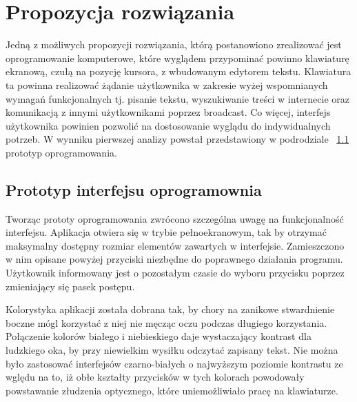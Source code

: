 \documentclass[twoside,a4paper]{book}
\begin{document}
\section{Propozycja rozwiązania}
Jedną z możliwych propozycji rozwiązania, którą postanowiono zrealizować jest oprogramowanie komputerowe, które wyglądem przypominać powinno klawiaturę ekranową, czułą na pozycję kursora, z wbudowanym edytorem tekstu. Klawiatura ta powinna realizować żądanie użytkownika w zakresie wyżej wspomnianych wymagań funkcjonalnych tj. pisanie tekstu, wyszukiwanie treści w internecie oraz komunikacją z innymi użytkownikami poprzez broadcast. Co więcej, interfejs użytkownika powinien pozwolić na dostosowanie wyglądu do indywidualnych potrzeb. W wynniku pierwszej analizy powstał przedstawiony w podrodziale ~\ref{sec:key} prototyp oprogramowania. 
\subsection{Prototyp interfejsu oprogramownia}\label{sec:key}
Tworząc prototy oprogramowania zwrócono szczególna uwagę na funkcjonalność interfejsu. Aplikacja otwiera się w trybie pełnoekranowym, tak by otrzymać maksymalny dostępny rozmiar elementów zawartych w interfejsie. Za\-mie\-szczo\-no w nim opisane powyżej przyciski niezbędne do poprawnego działania programu. Użytkownik informowany jest o pozostałym czasie do wyboru przycisku poprzez zmieniający się pasek postępu. 

Kolorystyka aplikacji została dobrana tak, by chory na zanikowe stwardnienie boczne  mógl korzystać z niej nie męcząc oczu podczas długiego korzystania. Połączenie kolorów bia\-łe\-go i niebieskiego daje wystaczający kontrast dla ludzkiego oka, by przy niewielkim wysiłku odczytać zapisany tekst. Nie można było zastosować interfejsów czarno-białych o najwyższym poziomie kontrastu ze wględu na to, iż obłe kształty przycisków w tych kolorach powodowały powstawanie złudzenia optycznego, które uniemożliwiało pracę na klawiaturze. 
\end{document}
